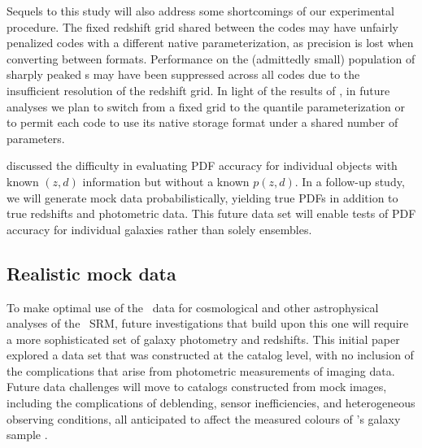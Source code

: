 
Sequels to this study will also address some shortcomings of our experimental procedure.
The fixed redshift grid shared between the codes may have unfairly penalized codes with a different native parameterization, as precision is lost when converting between formats.
Performance on the (admittedly small) population of sharply peaked \pzpdf s may have been suppressed across all codes due to the insufficient resolution of the redshift grid.
In light of the results of \citet[]{malz_approximating_2018}, in future analyses we plan to switch from a fixed grid to the quantile parameterization or to permit each code to use its native storage format under a shared number of parameters.

 discussed the difficulty in evaluating PDF accuracy for individual objects with known $(z, d)$ information but without a known $p(z, d)$.
In a follow-up study, we will
generate mock data probabilistically, yielding true PDFs in addition to true redshifts and photometric data.
This future data set will enable tests of PDF accuracy for individual galaxies rather than solely ensembles.

\subsection{Realistic mock data}

To make optimal use of the \lsst\ data for cosmological and other astrophysical analyses of the \lsstdesc\ SRM, future investigations that build upon this one will require a more sophisticated set of galaxy photometry and redshifts.
This initial paper explored a data set that was constructed at the catalog level, with no inclusion of the complications that arise from photometric measurements of imaging data.
Future data challenges will move to catalogs constructed from mock images, including the complications of deblending, sensor inefficiencies, and heterogeneous observing conditions, all anticipated to affect the measured colours of \lsst's galaxy sample \citep{dawson_ellipticity_2015}.

